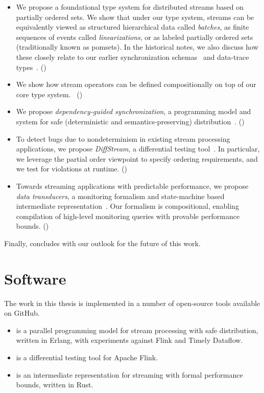 \begin{itemize}
\item
We propose a foundational type system for distributed streams based on partially ordered sets.
We show that under our type system, streams can be equivalently viewed as
structured hierarchical data called \emph{batches},
as finite sequences of events called \emph{linearizations},
or as labeled partially ordered sets (traditionally known as pomsets).
In the historical notes, we also discuss how these closely relate to
our earlier synchronization schemas~ and data-trace types~.
()

\item
We show how stream operators can be defined compositionally on top of our core type system.~ ()

\item
We propose \emph{dependency-guided synchronization},
a programming model and system for safe (deterministic and semantics-preserving) distribution~.
()

\item
To detect bugs due to nondeterminism in existing stream processing applications,
we propose \emph{DiffStream}, a differential testing tool~.
In particular, we leverage the partial order viewpoint to specify
ordering requirements, and we test for violations at runtime.
()

\item
Towards streaming applications with predictable performance,
we propose \emph{data transducers}, a monitoring formalism and state-machine based intermediate representation~.
Our formalism is compositional, enabling compilation of high-level
monitoring queries with provable performance bounds.
()
\end{itemize}

Finally, 
concludes with our outlook for the future of this work.

\section{Software}

The work in this thesis is implemented in a number of open-source tools available on GitHub.
\begin{samepage}
\begin{itemize}
\item {} is a parallel programming model for stream processing with safe distribution, written in Erlang, with experiments against Flink and Timely Dataflow.
\item {} is a differential testing tool for Apache Flink.
\item {} is an intermediate representation for streaming with formal performance bounds, written in Rust.
\end{itemize}
\end{samepage}

